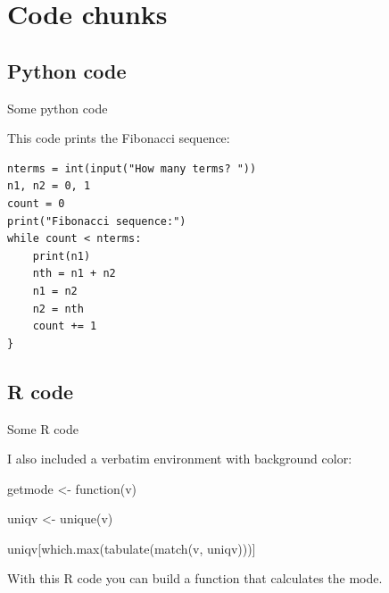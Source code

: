\section{Code chunks}

\subsection{Python code}


\begin{frame}[fragile]{Some python code}

This code prints the Fibonacci sequence:

\begin{verbatim}
nterms = int(input("How many terms? "))
n1, n2 = 0, 1
count = 0
print("Fibonacci sequence:")
while count < nterms:
    print(n1)
    nth = n1 + n2
    n1 = n2
    n2 = nth
    count += 1
}
\end{verbatim}

\end{frame}

\subsection{R code}


\begin{frame}[fragile]{Some R code}

I also included a verbatim environment with background color:

\begin{cverbatim}
getmode <- function(v) {
  
  uniqv <- unique(v)
  
  uniqv[which.max(tabulate(match(v, uniqv)))]
  
}
\end{cverbatim}

With this R code you can build a function that calculates the mode.

\end{frame}



















